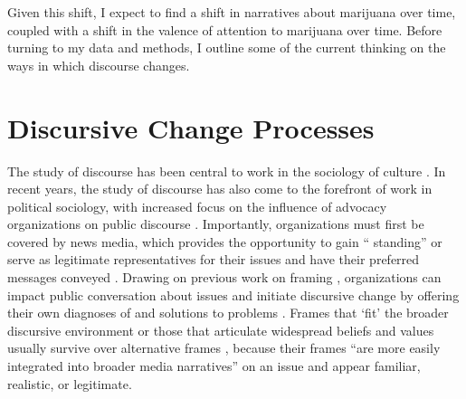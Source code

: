 Given this shift, I expect to find a shift in narratives about marijuana over time, coupled with a shift in the valence of attention to marijuana over time. Before turning to my data and methods, I outline some of the current thinking on the ways in which discourse changes. 




%

%







\section{Discursive Change Processes}

The study of discourse has been central to work in the sociology of culture \citep{dimaggio_1997,swidler_1986,lamont_1992}. In recent years, the study of discourse has also come to the forefront of work in political sociology, with increased focus on the influence of advocacy organizations on public discourse \citep{bail_2012,earl_2004,mccammon_et_al_2007,ghaziani_and_baldassarri_2011,vasi_et_al_2015,gamson_and_modigliani_1989,andrews_and_caren_2010}. Importantly, organizations must first be covered by news media, which provides the opportunity to gain `` standing'' or serve as legitimate representatives for their issues and have their preferred messages conveyed \citep{amenta_et_al_2012,ferree_et_al_2002,elliott_et_al_2016}. Drawing on previous work on framing \citep{goffman_1974,benford_and_snow_2000}, organizations can impact public conversation about issues \citep{bail_et_al_2017} and initiate discursive change by offering their own diagnoses of and solutions to problems \citep{bail_2012,snow_et_al_2007,benford_and_snow_2000}. Frames that `fit' the broader discursive environment \citep{mccammon_et_al_2007} or those that articulate widespread beliefs and values usually survive over alternative frames \citep{mccammon_et_al_2001,snow_et_al_2007,gamson_and_modigliani_1989}, because their frames ``are more easily integrated into broader media narratives'' on an issue \citep[858]{bail_2012} and appear familiar, realistic, or legitimate. 



